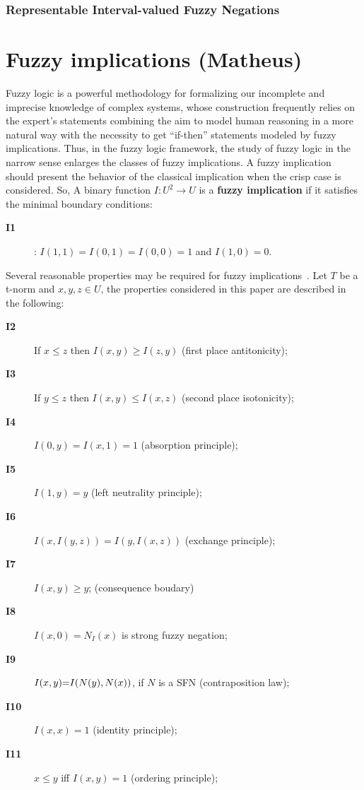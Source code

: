 \documentclass[12pt]{article}
\theoremstyle{plain}
\theoremstyle{remark}
\theoremstyle{definition}
\theoremstyle{proposition}
\begin{document}
\subsubsection{Representable Interval-valued Fuzzy Negations}

\section{Fuzzy implications (Matheus)}\label{sec-5imp}

Fuzzy logic is a powerful methodology for formalizing our incomplete and imprecise knowledge of complex systems, whose construction frequently relies on the expert's statements combining the aim to model human reasoning in a more natural way  with the necessity to get ``if-then'' statements modeled by fuzzy implications. Thus, in the fuzzy logic framework, the study of fuzzy logic in the narrow sense enlarges the classes of fuzzy implications.
A fuzzy implication should present the  behavior of  the classical
implication when  the crisp case is considered. So,
A binary function $I:U^2 \rightarrow U$ is a {\bf fuzzy implication} if it satisfies the minimal boundary conditions:
\begin{description}
\item [\textbf{I{1}}]: $I(1,1)=I(0,1)=I(0,0)=1$ and $I(1,0)=0$.
\end{description}

Several reasonable properties  may be required for fuzzy
implications~\cite{BJ08}. Let $T$ be a t-norm and $x,y,z \in U$, the properties considered in this paper
are described in the
following:
%
\begin{description}
%
\item [\textbf{I{2}}] If $x \leq z$ then $I(x,y) \geq I(z,y)$ (first place antitonicity);
%
\item [\textbf{I{3}}] If $y \leq z$ then $I(x,y) \leq I(x,z)$ (second place
isotonicity);
%
\item [\textbf{I{4}}] $I(0,y)=I(x,1)=1$ (absorption principle);
%
\item [\textbf{I{5}}] $I(1,y) = y$ (left neutrality principle);
%
\item [\textbf{I{6}}] $I(x,I(y,z))= I(y,I(x,z))$ (exchange principle);
%
\item [\textbf{I{7}}] $I(x,y)\geq y$; (consequence boudary)
%
\item [\textbf{I{8}}] $I(x,0)=N_I(x)$ is strong fuzzy negation; %
%
\item [\textbf{I{9}}] $I(x,y)\hspace{-0.1cm}=\hspace{-0.1cm}I(N(y),N(x))$, if \hspace{-0.1cm}$N$\hspace{-0.1cm}  is a SFN (contraposition law);
\item [\textbf{I{10}}] $I(x,x)=1$ (identity principle);
%
\item [\textbf{I{11}}] $x\leq y$ iff $I(x,y)=1$ (ordering principle);
%
\end{description}
\end{document}

